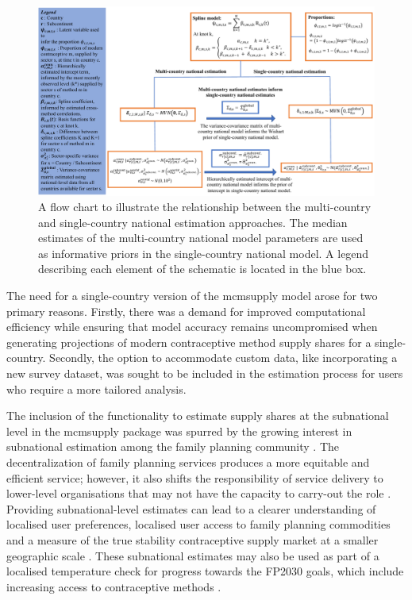 \begin{figure}[H]
\includegraphics[width=1\linewidth,height=0.35\textheight]{figures/fig_1} \caption{A flow chart to illustrate the relationship between the multi-country and single-country national estimation approaches. The median estimates of the multi-country national model parameters are used as informative priors in the single-country national model. A legend describing each element of the schematic is located in the blue box.}\label{fig:fig-1}
\end{figure}

The need for a single-country version of the mcmsupply model arose for two primary reasons. Firstly, there was a demand for improved computational efficiency while ensuring that model accuracy remains uncompromised when generating projections of modern contraceptive method supply shares for a single-country. Secondly, the option to accommodate custom data, like incorporating a new survey dataset, was sought to be included in the estimation process for users who require a more tailored analysis.

The inclusion of the functionality to estimate supply shares at the subnational level in the mcmsupply package was spurred by the growing interest in subnational estimation among the family planning community \citep{New2017, Mercer2019, Li2019}. The decentralization of family planning services produces a more equitable and efficient service; however, it also shifts the responsibility of service delivery to lower-level organisations that may not have the capacity to carry-out the role \citep{Williamson2014}. Providing subnational-level estimates can lead to a clearer understanding of localised user preferences, localised user access to family planning commodities and a measure of the true stability contraceptive supply market at a smaller geographic scale \citep{Bossert2002}. These subnational estimates may also be used as part of a localised temperature check for progress towards the FP2030 goals, which include increasing access to contraceptive methods \citep{Munoz2022}.

